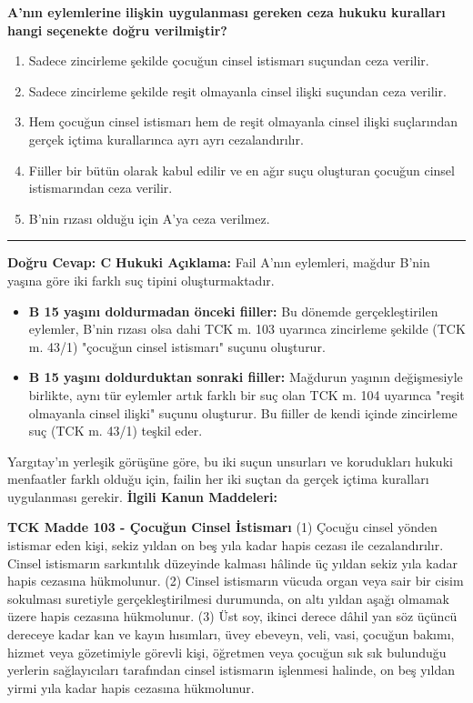 \documentclass[a4paper, 11pt, twocolumn]{article}
\newenvironment{lawbox}{%
    \par\noindent
    \begin{tcolorbox}[
        colback=lawbg,
        colframe=boxcolor,
        fonttitle=\bfseries,
        boxrule=0.5pt,
        left=3pt,
        right=3pt,
        top=3pt,
        bottom=3pt,
        width=\columnwidth,
        arc=2pt,
        before skip=0.2cm,
        after skip=0.2cm
    ]
    \footnotesize\itshape
}{\end{tcolorbox}}
\begin{document}
\textbf{A'nın eylemlerine ilişkin uygulanması gereken ceza hukuku kuralları hangi seçenekte doğru verilmiştir?}

\begin{enumerate}[label=\Alph*)]
    \item Sadece zincirleme şekilde çocuğun cinsel istismarı suçundan ceza verilir.
    \item Sadece zincirleme şekilde reşit olmayanla cinsel ilişki suçundan ceza verilir.
    \item Hem çocuğun cinsel istismarı hem de reşit olmayanla cinsel ilişki suçlarından gerçek içtima kurallarınca ayrı ayrı cezalandırılır.
    \item Fiiller bir bütün olarak kabul edilir ve en ağır suçu oluşturan çocuğun cinsel istismarından ceza verilir.
    \item B'nin rızası olduğu için A'ya ceza verilmez.
\end{enumerate}
\vspace{0.5cm}
\hrule
\vspace{0.5cm}
\textbf{Doğru Cevap: C}
\newline
\textbf{Hukuki Açıklama:} Fail A'nın eylemleri, mağdur B'nin yaşına göre iki farklı suç tipini oluşturmaktadır.
\begin{itemize}
    \item \textbf{B 15 yaşını doldurmadan önceki fiiller:} Bu dönemde gerçekleştirilen eylemler, B'nin rızası olsa dahi TCK m. 103 uyarınca zincirleme şekilde (TCK m. 43/1) "çocuğun cinsel istismarı" suçunu oluşturur.
    \item \textbf{B 15 yaşını doldurduktan sonraki fiiller:} Mağdurun yaşının değişmesiyle birlikte, aynı tür eylemler artık farklı bir suç olan TCK m. 104 uyarınca "reşit olmayanla cinsel ilişki" suçunu oluşturur. Bu fiiller de kendi içinde zincirleme suç (TCK m. 43/1) teşkil eder.
\end{itemize}
Yargıtay'ın yerleşik görüşüne göre, bu iki suçun unsurları ve korudukları hukuki menfaatler farklı olduğu için, failin her iki suçtan da gerçek içtima kuralları uygulanması gerekir.
\vspace{0.5cm}
\textbf{İlgili Kanun Maddeleri:}
\begin{lawbox}
\textbf{TCK Madde 103 - Çocuğun Cinsel İstismarı}
\newline
(1) Çocuğu cinsel yönden istismar eden kişi, sekiz yıldan on beş yıla kadar hapis cezası ile cezalandırılır. Cinsel istismarın sarkıntılık düzeyinde kalması hâlinde üç yıldan sekiz yıla kadar hapis cezasına hükmolunur.
\newline
(2) Cinsel istismarın vücuda organ veya sair bir cisim sokulması suretiyle gerçekleştirilmesi durumunda, on altı yıldan aşağı olmamak üzere hapis cezasına hükmolunur.
\newline
(3) Üst soy, ikinci derece dâhil yan söz üçüncü dereceye kadar kan ve kayın hısımları, üvey ebeveyn, veli, vasi, çocuğun bakımı, hizmet veya gözetimiyle görevli kişi, öğretmen veya çocuğun sık sık bulunduğu yerlerin sağlayıcıları tarafından cinsel istismarın işlenmesi halinde, on beş yıldan yirmi yıla kadar hapis cezasına hükmolunur.
\end{lawbox}
\end{document}
